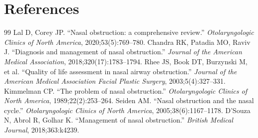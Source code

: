 \section*{References}
\begin{thebibliography}{99}
 Lal D, Corey JP. ``Nasal obstruction: a comprehensive review.'' \textit{Otolaryngologic Clinics of North America}, 2020;53(5):769--780.
 Chandra RK, Patadia MO, Raviv J. ``Diagnosis and management of nasal obstruction.'' \textit{Journal of the American Medical Association}, 2018;320(17):1783--1794.
 Rhee JS, Book DT, Burzynski M, et al. ``Quality of life assessment in nasal airway obstruction.'' \textit{Journal of the American Medical Association Facial Plastic Surgery}, 2003;5(4):327--331.
 Kimmelman CP. ``The problem of nasal obstruction.'' \textit{Otolaryngologic Clinics of North America}, 1989;22(2):253--264.
 Seiden AM. ``Nasal obstruction and the nasal cycle.'' \textit{Otolaryngologic Clinics of North America}, 2005;38(6):1167--1178.
 D'Souza N, Abrol R, Golhar K. ``Management of nasal obstruction.'' \textit{British Medical Journal}, 2018;363:k4239.

\end{thebibliography}
